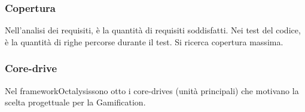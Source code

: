 \subsubsection*{Copertura}
Nell'analisi dei requisiti, è la quantità di requisiti soddisfatti. Nei test del codice, è la quantità di righe percorse durante il test. Si ricerca copertura massima.

\subsubsection*{Core-drive}
Nel framework\glosp Octalysis\glosp sono otto i core-drives (unità principali) che motivano la scelta progettuale per la Gamification\glo.

